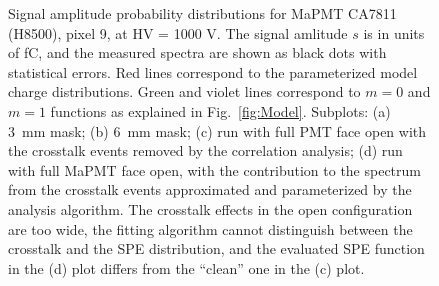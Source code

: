 \begin{figure}[hbt]
  \caption{Signal amplitude probability distributions for MaPMT CA7811 (H8500), pixel 9, at HV = 1000 V. The signal amlitude $s$ is in units of fC, and the measured spectra are shown as black dots with statistical errors. Red lines correspond to the parameterized model charge distributions. Green and violet lines correspond to $m=0$ and $m=1$ functions as explained in Fig.~\ref{fig:Model}. Subplots: (a) 3~mm mask; (b) 6~mm mask; (c) run with full PMT face open with the crosstalk events removed by the correlation analysis; (d) run with full MaPMT face open, with the contribution to the spectrum from the crosstalk events approximated and parameterized by the analysis algorithm. The crosstalk effects in the open configuration are too wide, the fitting algorithm cannot distinguish between the crosstalk and the SPE distribution, and the evaluated SPE function in the (d) plot differs from the ``clean'' one in the (c) plot.
    }
\label{fig:CA7811}
\end{figure}

